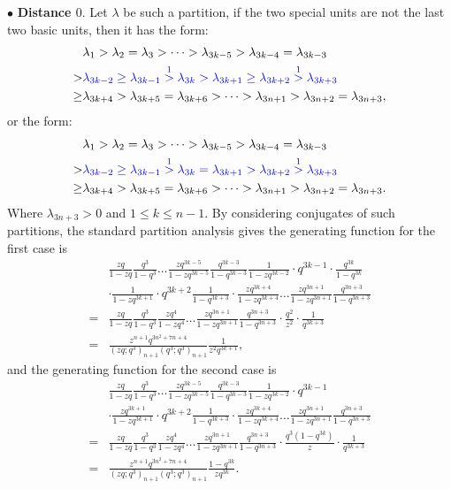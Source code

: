 \documentclass[draft]{amsart}
\numberwithin{equation}{section}
\theoremstyle{plain}
\theoremstyle{remark}
\begin{document}
$\bullet$ {\bf Distance $0.$} Let $\lambda$ be such a partition, if the two special units are not the last two basic units,
 then it has the form:
\begin{align*}
&\lambda_{1}>\lambda_{2}=\lambda_{3}>\dots>\lambda_{3k-5}>\lambda_{3k-4}=\lambda_{3k-3}\\
>&{\color{blue}\lambda_{3k-2}\geq\lambda_{3k-1}\overset{1}{>}\lambda_{3k}>\lambda_{3k+1}\geq \lambda_{3k+2}\overset{1}{>}\lambda_{3k+3}}\\
\geq &\lambda_{3k+4}>\lambda_{3k+5}=\lambda_{3k+6}>\dots >\lambda_{3n+1}>\lambda_{3n+2}=\lambda_{3n+3},
\end{align*}
 or the form:
\begin{align*}
&\lambda_{1}>\lambda_{2}=\lambda_{3}>\dots>\lambda_{3k-5}>\lambda_{3k-4}=\lambda_{3k-3}\\
>&{\color{blue}\lambda_{3k-2}\geq\lambda_{3k-1}\overset{1}{>}\lambda_{3k}=\lambda_{3k+1}> \lambda_{3k+2}\overset{1}{>}\lambda_{3k+3}}\\
\geq &\lambda_{3k+4}>\lambda_{3k+5}=\lambda_{3k+6}>\dots >\lambda_{3n+1}>\lambda_{3n+2}=\lambda_{3n+3}.
\end{align*}
Where $\lambda_{3n+3}>0$ and $1\leq k\leq n-1$. By considering conjugates of such partitions, the standard partition analysis gives the generating function for the first case is
\begin{align}
 &\frac{zq}{1-zq}\frac{q^{3}}{1-q^{3}}\dots\frac{zq^{3k-5}}{1-zq^{3k-5}}\frac{q^{3k-3}}{1-q^{3k-3}}
 \frac{1}{1-zq^{3k-2}}\cdot q^{3k-1}\cdot\frac{q^{3k}}{1-q^{3k}}\nonumber\\
 &\cdot\frac{1}{1-zq^{3k+1}}\cdot q^{3k+2}\frac{1}{1-q^{3k+3}}
\cdot\frac{zq^{3k+4}}{1-zq^{3k+4}}\dots\frac{zq^{3n+1}}{1-zq^{3n+1}}\frac{q^{3n+3}}{1-q^{3n+3}}\nonumber\\
= &\frac{zq}{1-zq}\frac{q^{3}}{1-q^{3}} \frac{zq^{4}}{1-zq^{4}}\dots\frac{zq^{3n+1}}{1-zq^{3n+1}} \frac{q^{3n+3}}{1-q^{3n+3}}\cdot\frac{q^{2}}{z^{2}}\cdot\frac{1}{q^{3k+3}}\nonumber\\
=&\frac{z^{n+1}q^{3n^{2}+7n+4}}{(zq;q^{3})_{n+1}(q^{3};q^{3})_{n+1}}\frac{1}{z^{2}q^{3k+1}},\label{3.5}
\end{align}
and the generating function for the second case is
\begin{align}
 &\frac{zq}{1-zq}\frac{q^{3}}{1-q^{3}}\dots\frac{zq^{3k-5}}{1-zq^{3k-5}}\frac{q^{3k-3}}{1-q^{3k-3}}
 \frac{1}{1-zq^{3k-2}}\cdot q^{3k-1}\nonumber\\
& \cdot\frac{zq^{3k+1}}{1-zq^{3k+1}}\cdot q^{3k+2}\frac{1}{1-q^{3k+3}}
\cdot\frac{zq^{3k+4}}{1-zq^{3k+4}}\dots\frac{zq^{3n+1}}{1-zq^{3n+1}}\frac{q^{3n+3}}{1-q^{3n+3}}\nonumber\\
=& \frac{zq}{1-zq}\frac{q^{3}}{1-q^{3}} \frac{zq^{4}}{1-zq^{4}}\dots\frac{zq^{3n+1}}{1-zq^{3n+1}} \frac{q^{3n+3}}{1-q^{3n+3}}\cdot\frac{q^{3}(1-q^{3k})}{z}\cdot\frac{1}{q^{3k+3}}\nonumber\\
=&\frac{z^{n+1}q^{3n^{2}+7n+4}}{(zq;q^{3})_{n+1}(q^{3};q^{3})_{n+1}}\frac{1-q^{3k}}{zq^{3k}}.\label{3.6}
 \end{align}
\end{document}
